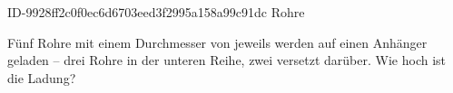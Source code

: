 \begin{exercise}
      {ID-9928ff2c0f0ec6d6703eed3f2995a158a99c91dc}
      {Rohre}
  \ifproblem\problem
    \begin{minipage}{0.2\textwidth}
      \centering
    \end{minipage}\hfill
    \begin{minipage}{0.75\textwidth}
      Fünf Rohre mit einem Durchmesser von jeweils  werden auf einen Anhänger
      geladen -- drei Rohre in der unteren Reihe, zwei versetzt darüber.
      Wie hoch ist die Ladung?
    \end{minipage}
  \fi
\end{exercise}
